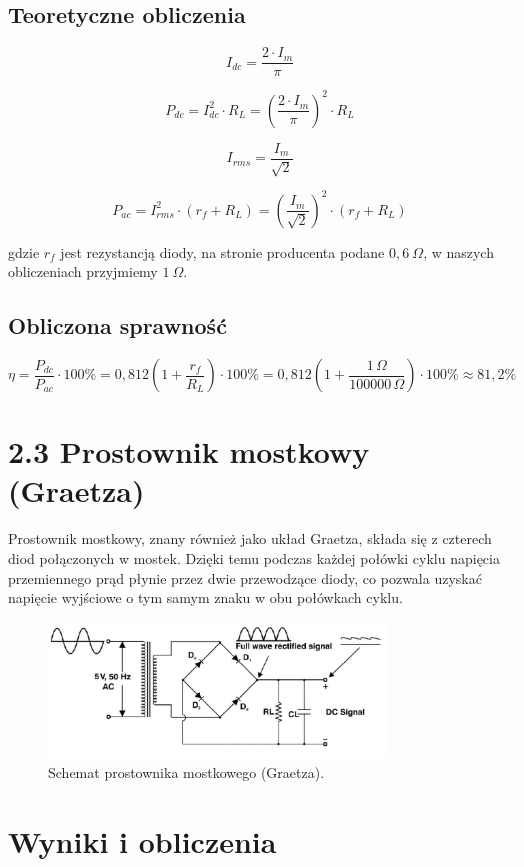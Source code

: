\documentclass[a4paper,12pt]{article}
\begin{document}
\subsection*{Teoretyczne obliczenia}

\[
I_{dc} = \frac{2 \cdot I_m}{\pi}
\]

\[
P_{dc} = I_{dc}^2 \cdot R_L = \left( \frac{2 \cdot I_m}{\pi} \right)^2 \cdot R_L
\]

\[
I_{rms} = \frac{I_m}{\sqrt{2}}
\]

\[
P_{ac} = I_{rms}^2 \cdot (r_f + R_L) = \left( \frac{I_m}{\sqrt{2}} \right)^2 \cdot (r_f + R_L)
\]

gdzie $r_f$ jest rezystancją diody, na stronie producenta podane $0{,}6\ \Omega$, w naszych obliczeniach przyjmiemy $1\ \Omega$.

\subsection*{Obliczona sprawność}
\[
\eta = \frac{P_{dc}}{P_{ac}} \cdot 100\% = 0{,}812 \left( 1 + \frac{r_f}{R_L} \right) \cdot 100\% = 0{,}812 \left( 1 + \frac{1\,\Omega}{100000\,\Omega} \right) \cdot 100\% \approx 81{,}2\%
\]

\section*{2.3 Prostownik mostkowy (Graetza)}

Prostownik mostkowy, znany również jako układ Graetza, składa się z czterech diod połączonych w mostek. Dzięki temu podczas każdej połówki cyklu napięcia przemiennego prąd płynie przez dwie przewodzące diody, co pozwala uzyskać napięcie wyjściowe o tym samym znaku w obu połówkach cyklu.

\begin{figure}[H]
    \centering
    \includegraphics[width=0.8\textwidth]{8.png}
    \caption{Schemat prostownika mostkowego (Graetza).}
    \label{fig:schemat_mostek}
\end{figure}

\section*{Wyniki i obliczenia}
\end{document}
